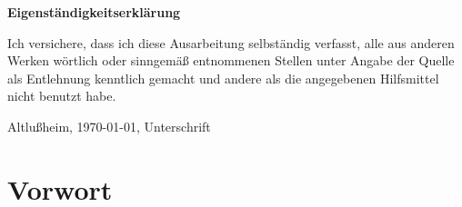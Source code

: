 \documentclass[12pt]{scrreprt}
\begin{document}
\makeititle
\begin{center}
	\sffamily\bfseries{Eigenständigkeitserklärung}
\end{center}
Ich versichere, dass ich diese Ausarbeitung selbständig verfasst, alle aus
anderen Werken wörtlich oder sinngemäß entnommenen Stellen unter Angabe der
Quelle als Entlehnung kenntlich gemacht und andere als die angegebenen
Hilfsmittel nicht benutzt habe.

Altlußheim, \today, Unterschrift
\tableofcontents
\listoffigures
\listoftables

\chapter{Vorwort}
	\label{chap:vorwort}
\end{document}
